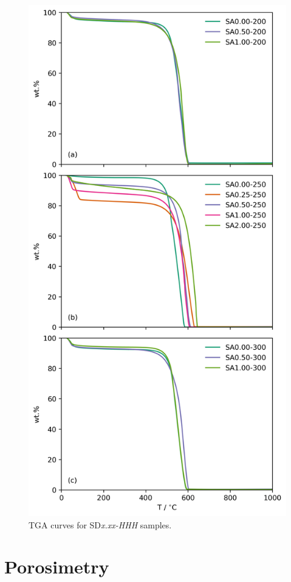 \begin{appendices}
\begin{figure}[hptb]
    \centering
    \includegraphics[width=0.8\columnwidth, keepaspectratio]{4-impregnation/figs/SD_tga_adj.png}
    \caption{TGA curves for SD\textit{x.xx-HHH} samples.}
    \label{fig:SD_tga}
\end{figure}

\chapter{Porosimetry}


\end{appendices}
